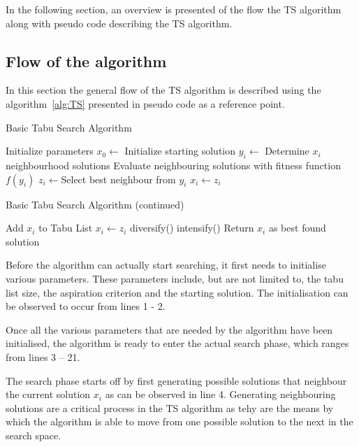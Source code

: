 In the following section, an overview is presented of the flow the \gls{TS} algorithm along with pseudo code describing the \gls{TS} algorithm.
\subsection{Flow of the algorithm}
In this section the general flow of the \gls{TS} algorithm is described using the algorithm~\ref{alg:TS} presented in pseudo code as a reference point.
\begin{algorithm}[H]
\caption{Basic Tabu Search Algorithm\cite{TabuRCAProblem,TabuMontemanniSmith}}
\label{alg:TS}
	\begin{algorithmic}[1]
		\State Initialize parameters
		\State $x_0 \leftarrow$ Initialize starting solution
			\State $y_i \leftarrow$ Determine $x_i$ neighbourhood solutions 
			\State Evaluate neighbouring solutions with fitness function $f(y_i)$
			\State $z_i \leftarrow$Select best neighbour from $y_i$
					\State $x_i \leftarrow z_i$
				\EndIf
	\end{algorithmic}
\end{algorithm}

\begin{algorithm}[H]
\caption{Basic Tabu Search Algorithm (continued) \cite{TabuRCAProblem,TabuMontemanniSmith}}
\label{alg:TS2}
	\begin{algorithmic}[1]
			\Else
				\State Add $x_i$ to Tabu List
				\State $x_i \leftarrow z_i$
					\State diversify()
				\Else
					\State intensify()
				\EndIf
			\EndIf
		\EndWhile
		\State Return $x_i$ as best found solution
	\end{algorithmic}
\end{algorithm}

Before the algorithm can actually start searching, it first needs to initialise various parameters. These parameters include, but are not limited to, the tabu list size, the aspiration criterion and the starting solution. The initialisation can be observed to occur from lines 1 - 2.

Once all the various parameters that are needed by the algorithm have been initialised, the algorithm is ready to enter the actual search phase, which ranges from lines 3 -- 21. 

The search phase starts off by first generating possible solutions that neighbour the current solution $x_i$ as can be observed in line 4. Generating neighbouring solutions are a critical process in the \gls{TS} algorithm as tehy are the means by which the algorithm is able to move from one possible solution to the next in the search space.

